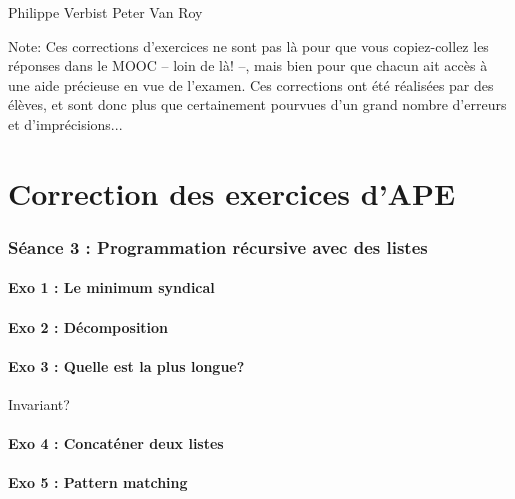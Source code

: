 

\DeclareMathOperator{\pgcd}{PGCD}

{Philippe Verbist}
{Peter Van Roy}


\newcommand{\st}{\mathrm{ST}}
\newcommand{\ce}{\mathrm{CE}}
\newcommand{\mozart}{Mozart}

\vspace{1cm}
Note: Ces corrections d'exercices ne sont pas là pour que vous copiez-collez les réponses dans le MOOC -- loin de là! --, mais bien pour que chacun ait accès à une aide précieuse en vue de l'examen.
Ces corrections ont été réalisées par des élèves, et sont donc plus que certainement pourvues d'un grand nombre d'erreurs et d'imprécisions... 






\newpage
\part{Correction des exercices d'APE}
\section{Séance 3 : Programmation récursive avec des listes}

\subsection{Exo 1 : Le minimum syndical}


\subsection{Exo 2 : Décomposition}


\subsection{Exo 3 : Quelle est la plus longue?}

Invariant?

\subsection{Exo 4 : Concaténer deux listes}


\subsection{Exo 5 : Pattern matching}


